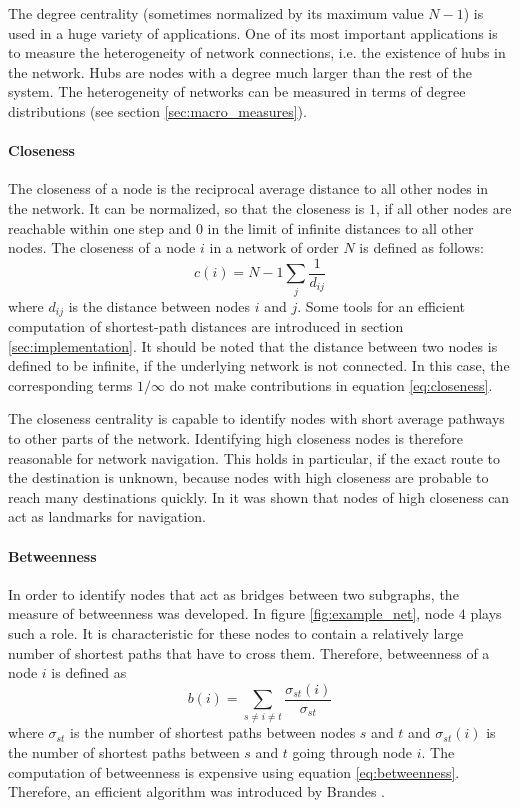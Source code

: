 The degree centrality (sometimes normalized by its maximum value $N-1$) is used in a huge variety of applications.
One of its most important applications is to measure the heterogeneity of network connections, i.e. the existence of hubs in the network.
Hubs are nodes with a degree much larger than the rest of the system.
The heterogeneity of networks can be measured in terms of degree distributions (see section \ref{sec:macro_measures}).

\paragraph{Closeness\color{Cayenne}{.}} 
The closeness of a node is the reciprocal average distance to all other nodes in the network.
It can be normalized, so that the closeness is $1$, if all other nodes are reachable within one step and $0$ in the limit of infinite distances to all other nodes.
The closeness of a node $i$ in a network of order $N$ is defined as follows:
\begin{equation}\label{eq:closeness}
c(i)=N-1 \sum _j \frac{1}{ d_{ij}}
\end{equation}
where $d_{ij}$ is the distance between nodes $i$ and $j$.
Some tools for an efficient computation of shortest-path distances are introduced in section \ref{sec:implementation}.
It should be noted that the distance between two nodes is defined to be infinite, if the underlying network is not connected.
In this case, the corresponding terms $1/\infty $ do not make contributions in equation \eqref{eq:closeness}.

The closeness centrality is capable to identify nodes with short average pathways to other parts of the network.
Identifying high closeness nodes is therefore reasonable for network navigation.
This holds in particular, if the exact route to the destination is unknown, because nodes with high closeness are probable to reach many destinations quickly.
In \citep{Zweig:closeness} it was shown that nodes of high closeness can act as landmarks for navigation.


\paragraph{Betweenness\color{Cayenne}{.}}
In order to identify nodes that act as bridges between two subgraphs, the measure of betweenness was developed.
In figure \ref{fig:example_net}, node $4$ plays such a role.
It is characteristic for these nodes to contain a relatively large number of shortest paths that have to cross them.
Therefore, betweenness of a node $i$ is defined as
\begin{equation}\label{eq:betweenness}
b(i)=\sum _{s\neq i \neq t} \frac{\sigma _{st}(i)}{\sigma _{st}}
\end{equation}
where $\sigma _{st}$ is the number of shortest paths between nodes $s$ and $t$ and $\sigma _{st} (i)$ is the number of shortest paths between $s$ and $t$ going through node $i$.
The computation of betweenness is expensive using equation \eqref{eq:betweenness}.
Therefore, an efficient algorithm was introduced by Brandes \citep{Brandes:2001p2757}.


